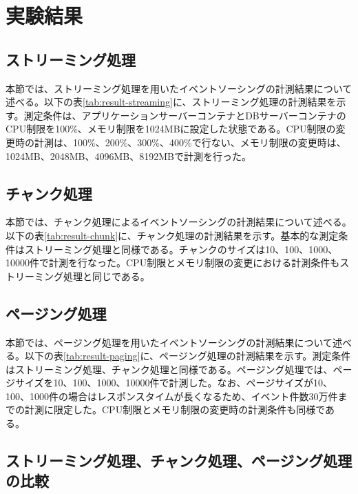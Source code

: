 \documentclass[../../main]{subfiles}
\begin{document}
    \section{実験結果}\label{sec:result}

    \subsection{ストリーミング処理}\label{subsec:result-streaming}

    本節では、ストリーミング処理を用いたイベントソーシングの計測結果について述べる。以下の表\ref{tab:result-streaming}に、ストリーミング処理の計測結果を示す。測定条件は、アプリケーションサーバーコンテナとDBサーバーコンテナのCPU制限を100\%、メモリ制限を1024MBに設定した状態である。CPU制限の変更時の計測は、100\%、200\%、300\%、400\%で行ない、メモリ制限の変更時は、1024MB、2048MB、4096MB、8192MBで計測を行った。

    

    \subsection{チャンク処理}\label{subsec:result-chunk}

    本節では、チャンク処理によるイベントソーシングの計測結果について述べる。以下の表\ref{tab:result-chunk}に、チャンク処理の計測結果を示す。基本的な測定条件はストリーミング処理と同様である。チャンクのサイズは10、100、1000、10000件で計測を行なった。CPU制限とメモリ制限の変更における計測条件もストリーミング処理と同じである。

    

    \subsection{ページング処理}\label{subsec:result-paging}

    本節では、ページング処理を用いたイベントソーシングの計測結果について述べる。以下の表\ref{tab:result-paging}に、ページング処理の計測結果を示す。測定条件はストリーミング処理、チャンク処理と同様である。ページング処理では、ページサイズを10、100、1000、10000件で計測した。なお、ページサイズが10、100、1000件の場合はレスポンスタイムが長くなるため、イベント件数30万件までの計測に限定した。CPU制限とメモリ制限の変更時の計測条件も同様である。

    

    \subsection{ストリーミング処理、チャンク処理、ページング処理の比較}\label{subsec:result-comparison}
\end{document}
